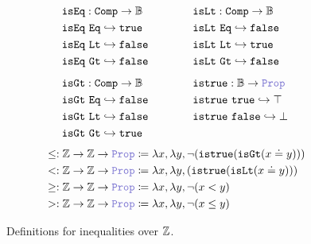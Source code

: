 \begin{figure}
\begin{framed}
{\[
\begin{array}{l@{\hspace{4em}}l}
\begin{aligned}
  &\tt{isEq} : \tt{Comp} \ra \B \\
  &\tt{isEq}~\tt{Eq} \re \tt{true} \\
  &\tt{isEq}~\tt{Lt} \re \tt{false} \\
  &\tt{isEq}~\tt{Gt} \re \tt{false}
\end{aligned}
&
\begin{aligned}
  &\tt{isLt} : \tt{Comp} \ra \B \\
  &\tt{isLt}~\tt{Eq} \re \tt{false} \\
  &\tt{isLt}~\tt{Lt} \re \tt{true} \\
  &\tt{isLt}~\tt{Gt} \re \tt{false}
\end{aligned}
\\[3em]
\begin{aligned}
  &\tt{isGt} : \tt{Comp} \ra \B \\
  &\tt{isGt}~\tt{Eq} \re \tt{false} \\
  &\tt{isGt}~\tt{Lt} \re \tt{false} \\
  &\tt{isGt}~\tt{Gt} \re \tt{true}
\end{aligned}
&
\begin{aligned}
  &\tt{istrue} : \B \ra \prop \\
  &\tt{istrue}~\tt{true} \re \top \\
  &\tt{istrue}~\tt{false} \re \bot\\
  &\\
\end{aligned}
\end{array}
\]
\noindent
\begin{align*}
&\leq: \Z \ra \Z \ra \prop  \coloneq \lambda x,\lambda y, \neg (\tt{istrue}(\tt{isGt}(x \doteq y))) \\
&<: \Z \ra \Z \ra \prop  \coloneq \lambda x,\lambda y, (\tt{istrue}(\tt{isLt}(x \doteq y))) \\
&\geq: \Z \ra \Z \ra \prop \coloneq \lambda x,\lambda y, \neg (x < y) \\
&>: \Z \ra \Z \ra \prop  \coloneq \lambda x,\lambda y, \neg (x \leq y)
\end{align*}
}%
\end{framed}
\caption{Definitions for inequalities over $\mathbb{Z}$.}
\label{fig:arith-inequalities-def}
\end{figure}

